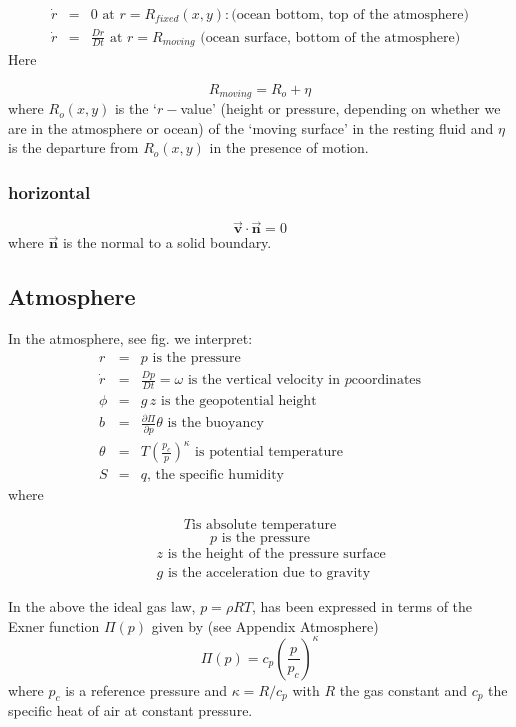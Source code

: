\begin{eqnarray*}
\dot{r} &=&0\text{ at }r=R_{fixed}(x,y):\text{(ocean bottom, top of the
atmosphere)} \\
\dot{r} &=&\frac{Dr}{Dt}\text{ at }r=R_{moving}\text{ (ocean surface, bottom
of the atmosphere)}
\end{eqnarray*}
Here

\[
R_{moving}=R_{o}+\eta 
\]
where $R_{o}(x,y)$ is the `$r-$value' (height or pressure, depending on
whether we are in the atmosphere or ocean) of the `moving surface' in the
resting fluid and $\eta $ is the departure from $R_{o}(x,y)$ in the presence
of motion.

\subsubsection{horizontal}

\[
\vec{\mathbf{v}}\cdot \vec{\mathbf{n}}=0 
\]
where $\vec{\mathbf{n}}$ is the normal to a solid boundary.

\subsection{Atmosphere}

In the atmosphere, see fig. we interpret: 
\begin{eqnarray}
r &=&p\text{ is the pressure} \\
\dot{r} &=&\frac{Dp}{Dt}=\omega \text{ is the vertical velocity in }p\text{
coordinates} \\
\phi  &=&g\,z\text{ is the geopotential height} \\
b &=&\frac{\partial \Pi }{\partial p}\theta \text{ is the buoyancy} \\
\theta  &=&T(\frac{p_{c}}{p})^{\kappa }\text{ is potential temperature} \\
S &=&q\text{, the specific humidity}
\end{eqnarray}
where

\[
T\text{is absolute temperature}
\]
\[
p\text{ is the pressure}
\]
\begin{eqnarray*}
&&z\text{ is the height of the pressure surface} \\
&&g\text{ is the acceleration due to gravity}
\end{eqnarray*}

In the above the ideal gas law, $p=\rho RT$, has been expressed in terms of
the Exner function $\Pi (p)$ given by (see Appendix Atmosphere) 
\[
\Pi (p)=c_{p}(\frac{p}{p_{c}})^{\kappa } 
\]
where $p_{c}$ is a reference pressure and $\kappa =R/c_{p}$ with $R$ the gas
constant and $c_{p}$ the specific heat of air at constant pressure.

